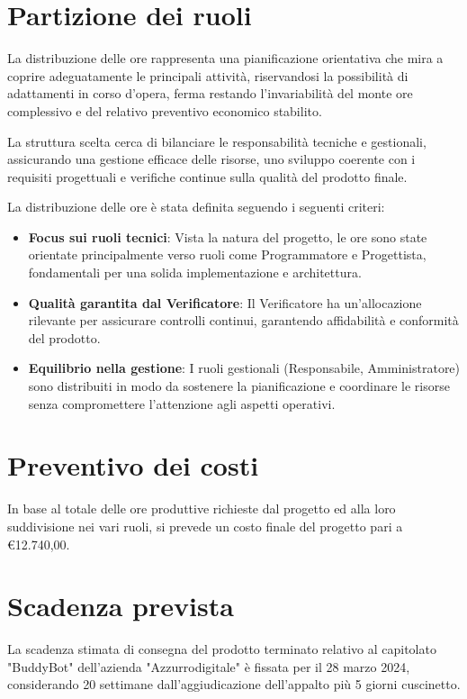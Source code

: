 \documentclass[italian, 12pt]{article}
\begin{document}
\section{Partizione dei ruoli}
La distribuzione delle ore rappresenta una pianificazione orientativa che mira a coprire adeguatamente le principali attività, riservandosi la possibilità di adattamenti in corso d’opera, ferma restando l'invariabilità del monte ore complessivo e del relativo preventivo economico stabilito.

La struttura scelta cerca di bilanciare le responsabilità tecniche e gestionali, assicurando una gestione efficace delle risorse, uno sviluppo coerente con i requisiti progettuali e verifiche continue sulla qualità del prodotto finale. 

La distribuzione delle ore è stata definita seguendo i seguenti criteri:
\begin{itemize}
    \item \textbf{Focus sui ruoli tecnici}: Vista la natura del progetto, le ore sono state orientate principalmente verso ruoli come Programmatore e Progettista, fondamentali per una solida implementazione e architettura.
    \item \textbf{Qualità garantita dal Verificatore}: Il Verificatore ha un’allocazione rilevante per assicurare controlli continui, garantendo affidabilità e conformità del prodotto.
    \item \textbf{Equilibrio nella gestione}: I ruoli gestionali (Responsabile, Amministratore) sono distribuiti in modo da sostenere la pianificazione e coordinare le risorse senza compromettere l’attenzione agli aspetti operativi.
\end{itemize}


\section{Preventivo dei costi}
In base al totale delle ore produttive richieste dal progetto ed alla loro suddivisione nei vari ruoli, si prevede un costo finale del progetto pari a €12.740,00.

\section{Scadenza prevista}
La scadenza stimata di consegna del prodotto terminato relativo al capitolato "BuddyBot" dell'azienda "Azzurrodigitale" è fissata per il 28 marzo 2024, considerando 20 settimane dall'aggiudicazione dell'appalto più 5 giorni cuscinetto.
\end{document}
